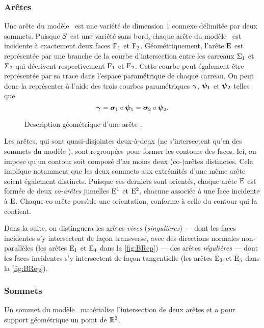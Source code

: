 \subsubsection{Arêtes}
\label{section:def_brep_edges}
Une arête du modèle \brep\ est une variété de dimension 1 connexe délimitée par deux sommets. 
Puisque $\mathcal{S}$ est une variété sans bord, chaque arête du modèle \brep\ est incidente à exactement deux faces $\mathrm{F}_1$ et $\mathrm{F}_2$. 
Géométriquement, l'arête $\mathrm{E}$ est représentée par une branche de la courbe d'intersection entre les carreaux $\Sigma_1$ et $\Sigma_2$ qui décrivent respectivement $\mathrm{F}_1$ et $\mathrm{F}_2$. 
Cette courbe peut également être représentée par sa trace dans l'espace paramétrique de chaque carreau. 
On peut donc la représenter à l'aide des trois courbes paramétriques $\bm{\gamma}$, $\bm{\psi}_1$ et $\bm{\psi}_2$ telles que
\begin{equation}
	\bm{\gamma} = \bm{\sigma}_1 \circ \bm{\psi}_1 = \bm{\sigma}_2 \circ \bm{\psi}_2.
\end{equation}

\begin{figure}
	\centering
	
	\caption{Description géométrique d'une arête \brep.}
\end{figure}

Les arêtes, qui sont quasi-disjointes deux-à-deux (\ie ne s'intersectent qu'en des sommets du modèle \brep), sont regroupées pour former les contours des faces. 
Ici, on impose qu'un contour soit composé d'au moins deux (co-)arêtes distinctes.
Cela implique notamment que les deux sommets aux extrémités d'une même arête soient également distincts.
Puisque ces derniers sont orientés, chaque arête $\mathrm{E}$ est formée de deux \textit{co-arêtes} jumelles $\mathrm{E}^1$ et $\mathrm{E}^2$, chacune associée à une face incidente à $\mathrm{E}$. 
Chaque co-arête possède une orientation, conforme à celle du contour qui la contient.\par
Dans la suite, on distinguera les arêtes \textit{vives} (\textit{singulières}) --- dont les faces incidentes s'y intersectent de façon transverse, \ie avec des directions normales non-parallèles (\eg les arêtes $\mathrm{E}_1$ et $\mathrm{E}_4$ dans la \autoref{fig:BRep}) --- des arêtes \textit{régulières} --- dont les faces incidentes s'y intersectent de façon tangentielle (\eg les arêtes $\mathrm{E}_3$ et $\mathrm{E}_5$ dans la \autoref{fig:BRep}).


\subsubsection{Sommets}
\label{section:def_brep_vertices}
Un sommet du modèle \brep\ matérialise l'intersection de deux arêtes et a pour support géométrique un point de $\mathbb{R}^3$.

